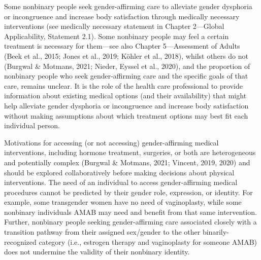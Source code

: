 \documentclass[
]{book}
\begin{document}
Some nonbinary people seek gender-affirming
care to alleviate gender dysphoria or incongruence and increase body satisfaction through medically necessary interventions (see medically
necessary statement in Chapter 2---Global
Applicability, Statement 2.1). Some nonbinary
people may feel a certain treatment is necessary
for them---see also Chapter 5---Assessment of
Adults (Beek et al., 2015; Jones et al., 2019;
Köhler et al., 2018), whilst others do not (Burgwal
\& Motmans, 2021; Nieder, Eyssel et al., 2020),
and the proportion of nonbinary people who seek
gender-affirming care and the specific goals of
that care, remains unclear. It is the role of the
health care professional to provide information
about existing medical options (and their availability) that might help alleviate gender dysphoria
or incongruence and increase body satisfaction
without making assumptions about which treatment options may best fit each individual person.

Motivations for accessing (or not accessing)
gender-affirming medical interventions, including
hormone treatment, surgeries, or both are heterogeneous and potentially complex (Burgwal \&
Motmans, 2021; Vincent, 2019, 2020) and should
be explored collaboratively before making decisions about physical interventions. The need of
an individual to access gender-affirming medical
procedures cannot be predicted by their gender
role, expression, or identity. For example, some
transgender women have no need of vaginoplasty,
while some nonbinary individuals AMAB may
need and benefit from that same intervention.
Further, nonbinary people seeking gender-affirming
care associated closely with a transition pathway
from their assigned sex/gender to the other
binarily-recognized category (i.e., estrogen therapy
and vaginoplasty for someone AMAB) does not
undermine the validity of their nonbinary identity.
\end{document}

